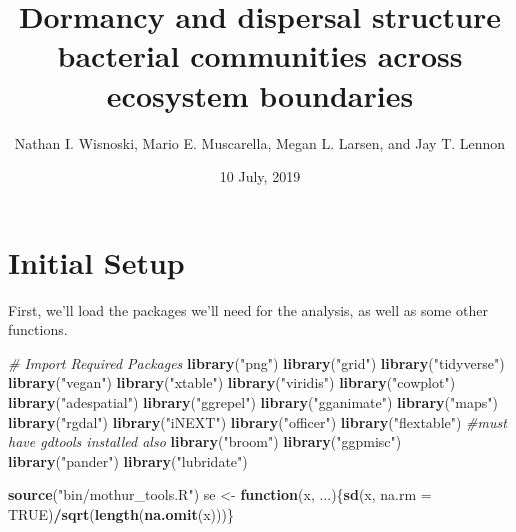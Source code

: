 \documentclass[]{article}
\title{Dormancy and dispersal structure bacterial communities across ecosystem
boundaries}
\author{Nathan I. Wisnoski, Mario E. Muscarella, Megan L. Larsen, and Jay T.
Lennon}
\date{10 July, 2019}
\newenvironment{Shaded}{\begin{snugshade}}{\end{snugshade}}
\newcommand{\CommentTok}[1]{\textcolor[rgb]{0.56,0.35,0.01}{\textit{#1}}}
\newcommand{\ControlFlowTok}[1]{\textcolor[rgb]{0.13,0.29,0.53}{\textbf{#1}}}
\newcommand{\DataTypeTok}[1]{\textcolor[rgb]{0.13,0.29,0.53}{#1}}
\newcommand{\KeywordTok}[1]{\textcolor[rgb]{0.13,0.29,0.53}{\textbf{#1}}}
\newcommand{\NormalTok}[1]{#1}
\newcommand{\OperatorTok}[1]{\textcolor[rgb]{0.81,0.36,0.00}{\textbf{#1}}}
\newcommand{\OtherTok}[1]{\textcolor[rgb]{0.56,0.35,0.01}{#1}}
\newcommand{\StringTok}[1]{\textcolor[rgb]{0.31,0.60,0.02}{#1}}
\begin{document}
\maketitle

\hypertarget{initial-setup}{%
\section{Initial Setup}\label{initial-setup}}

First, we'll load the packages we'll need for the analysis, as well as
some other functions.

\begin{Shaded}
\begin{Highlighting}[]
\CommentTok{# Import Required Packages}
\KeywordTok{library}\NormalTok{(}\StringTok{"png"}\NormalTok{)}
\KeywordTok{library}\NormalTok{(}\StringTok{"grid"}\NormalTok{)}
\KeywordTok{library}\NormalTok{(}\StringTok{"tidyverse"}\NormalTok{)   }
\KeywordTok{library}\NormalTok{(}\StringTok{"vegan"}\NormalTok{)}
\KeywordTok{library}\NormalTok{(}\StringTok{"xtable"}\NormalTok{)}
\KeywordTok{library}\NormalTok{(}\StringTok{"viridis"}\NormalTok{)}
\KeywordTok{library}\NormalTok{(}\StringTok{"cowplot"}\NormalTok{)}
\KeywordTok{library}\NormalTok{(}\StringTok{"adespatial"}\NormalTok{)}
\KeywordTok{library}\NormalTok{(}\StringTok{"ggrepel"}\NormalTok{)}
\KeywordTok{library}\NormalTok{(}\StringTok{"gganimate"}\NormalTok{)}
\KeywordTok{library}\NormalTok{(}\StringTok{"maps"}\NormalTok{)}
\KeywordTok{library}\NormalTok{(}\StringTok{"rgdal"}\NormalTok{)}
\KeywordTok{library}\NormalTok{(}\StringTok{"iNEXT"}\NormalTok{)}
\KeywordTok{library}\NormalTok{(}\StringTok{"officer"}\NormalTok{)}
\KeywordTok{library}\NormalTok{(}\StringTok{"flextable"}\NormalTok{) }\CommentTok{#must have gdtools installed also}
\KeywordTok{library}\NormalTok{(}\StringTok{"broom"}\NormalTok{)}
\KeywordTok{library}\NormalTok{(}\StringTok{"ggpmisc"}\NormalTok{)}
\KeywordTok{library}\NormalTok{(}\StringTok{"pander"}\NormalTok{)}
\KeywordTok{library}\NormalTok{(}\StringTok{"lubridate"}\NormalTok{)}

\KeywordTok{source}\NormalTok{(}\StringTok{"bin/mothur_tools.R"}\NormalTok{)}
\NormalTok{se <-}\StringTok{ }\ControlFlowTok{function}\NormalTok{(x, ...)\{}\KeywordTok{sd}\NormalTok{(x, }\DataTypeTok{na.rm =} \OtherTok{TRUE}\NormalTok{)}\OperatorTok{/}\KeywordTok{sqrt}\NormalTok{(}\KeywordTok{length}\NormalTok{(}\KeywordTok{na.omit}\NormalTok{(x)))\}}
\end{Highlighting}
\end{Shaded}
\end{document}

